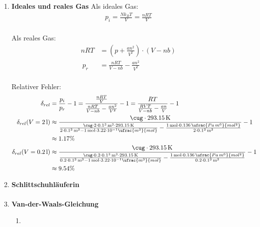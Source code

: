 \documentclass[11pt,letterpaper]{article}
\begin{document}

\begin{enumerate}
    \item \textbf{Ideales und reales Gas}
        Als ideales Gas:
        \begin{align*}
            p_{i}= \frac{N k_B T}{V}
            = \frac{n R T}{V}\\ 
        \end{align*}
        
        Als reales Gas:
        \begin{align*}
            n R T &= \left(p+\frac{a n^2}{V^2}\right) \cdot(V-n b)\\\
            p_r &= \frac{n R T}{V-n b} - \frac{a n^2}{V^2}\\
        \end{align*}

        Relativer Fehler:
        \begin{align*}
            \delta_{rel} &= \frac{p_i}{p_r} - 1
            = \frac{\frac{n R T}{V}}{\frac{n R T}{V-n b} - \frac{a n^2}{V^2}} - 1
            = \frac{R T}{\frac{R V T}{V-n b} - \frac{a n}{V}} - 1\\
            \delta_{rel}(V=2\,\mathrm{l})&\approx \frac{\cug \cdot 293.15\,\mathrm{K}}{\frac{\cug \cdot 2\cdot0.1^3\,\mathrm{m^3} \cdot 293.15\,\mathrm{K}}{2\cdot0.1^3\,\mathrm{m^3}-1\,\mathrm{mol}\cdot 3.22\cdot 10^{-1}\ufrac{m^3}{mol}} - \frac{1\,\mathrm{mol}\cdot 0.136\,\ufrac{Pa\,m^6}{mol^2}}{2\cdot0.1^3\,\mathrm{m^3}}} - 1\\
            &\approx 1.17\%\\
            \delta_{rel}(V=0.2\,\mathrm{l})&\approx \frac{\cug \cdot 293.15\,\mathrm{K}}{\frac{\cug \cdot 0.2\cdot0.1^3\,\mathrm{m^3} \cdot 293.15\,\mathrm{K}}{0.2\cdot0.1^3\,\mathrm{m^3}-1\,\mathrm{mol}\cdot 3.22\cdot 10^{-1}\ufrac{m^3}{mol}} - \frac{1\,\mathrm{mol}\cdot 0.136\,\ufrac{Pa\,m^6}{mol^2}}{0.2\cdot0.1^3\,\mathrm{m^3}}} - 1\\
            &\approx 9.54\%
        \end{align*}
    
    \item \textbf{Schlittschuhläuferin}
        \begin{align*}
        \end{align*}

    
    \item \textbf{Van-der-Waals-Gleichung}
        \begin{enumerate}
            \item
            \begin{align*}
            \end{align*}


\end{enumerate}
\end{enumerate}
\end{document}
